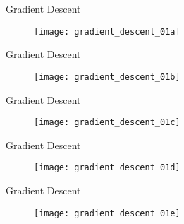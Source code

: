 \begin{frame}{Gradient Descent}
  \begin{figure}
    \texttt{[image: gradient\_descent\_01a]}
  \end{figure}

\end{frame}


\begin{frame}{Gradient Descent}
  \begin{figure}
    \texttt{[image: gradient\_descent\_01b]}
  \end{figure}

\end{frame}


\begin{frame}{Gradient Descent}
  \begin{figure}
    \texttt{[image: gradient\_descent\_01c]}
  \end{figure}

\end{frame}


\begin{frame}{Gradient Descent}
  \begin{figure}
    \texttt{[image: gradient\_descent\_01d]}
  \end{figure}

\end{frame}


\begin{frame}{Gradient Descent}
  \begin{figure}
    \texttt{[image: gradient\_descent\_01e]}
  \end{figure}

\end{frame}


